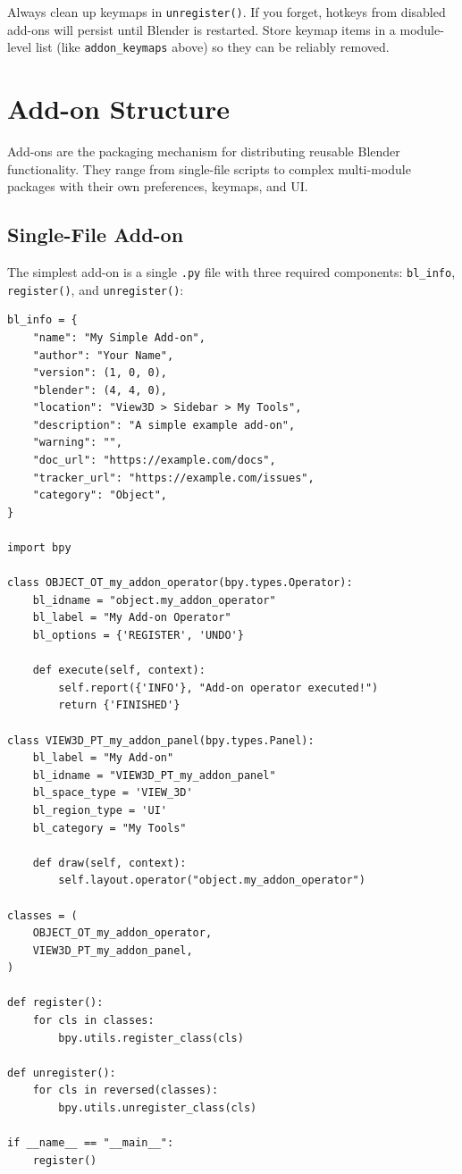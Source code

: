 \begin{warningbox}
Always clean up keymaps in \texttt{unregister()}. If you forget, hotkeys from disabled add-ons will persist until Blender is restarted. Store keymap items in a module-level list (like \texttt{addon\_keymaps} above) so they can be reliably removed.
\end{warningbox}


\section{Add-on Structure}
\label{sec:scripting-addons}

Add-ons are the packaging mechanism for distributing reusable Blender functionality. They range from single-file scripts to complex multi-module packages with their own preferences, keymaps, and UI.

\subsection{Single-File Add-on}

The simplest add-on is a single \texttt{.py} file with three required components: \texttt{bl\_info}, \texttt{register()}, and \texttt{unregister()}:

\begin{lstlisting}
bl_info = {
    "name": "My Simple Add-on",
    "author": "Your Name",
    "version": (1, 0, 0),
    "blender": (4, 4, 0),
    "location": "View3D > Sidebar > My Tools",
    "description": "A simple example add-on",
    "warning": "",
    "doc_url": "https://example.com/docs",
    "tracker_url": "https://example.com/issues",
    "category": "Object",
}

import bpy

class OBJECT_OT_my_addon_operator(bpy.types.Operator):
    bl_idname = "object.my_addon_operator"
    bl_label = "My Add-on Operator"
    bl_options = {'REGISTER', 'UNDO'}

    def execute(self, context):
        self.report({'INFO'}, "Add-on operator executed!")
        return {'FINISHED'}

class VIEW3D_PT_my_addon_panel(bpy.types.Panel):
    bl_label = "My Add-on"
    bl_idname = "VIEW3D_PT_my_addon_panel"
    bl_space_type = 'VIEW_3D'
    bl_region_type = 'UI'
    bl_category = "My Tools"

    def draw(self, context):
        self.layout.operator("object.my_addon_operator")

classes = (
    OBJECT_OT_my_addon_operator,
    VIEW3D_PT_my_addon_panel,
)

def register():
    for cls in classes:
        bpy.utils.register_class(cls)

def unregister():
    for cls in reversed(classes):
        bpy.utils.unregister_class(cls)

if __name__ == "__main__":
    register()
\end{lstlisting}

